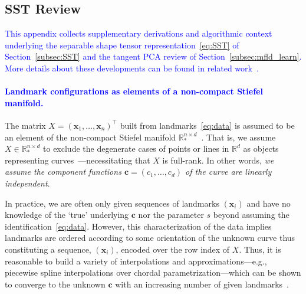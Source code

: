 \documentclass[pdflatex,iicol]{sn-jnl}%
\theoremstyle{thmstyleone}%
\theoremstyle{thmstyletwo}%
\theoremstyle{thmstylethree}%
\begin{document}
\begin{appendices}

\section{SST Review}\label{secA0}
\textcolor{blue}{This appendix collects supplementary derivations and algorithmic context underlying the separable shape tensor representation~\eqref{eq:SST} of Section~\ref{subsec:SST} and the tangent PCA review of Section~\ref{subsec:mfld_learn}. More details about these developments can be found in related work~\cite{grey2023separable}.}

\textcolor{blue}{\paragraph{Landmark configurations as elements of a non-compact Stiefel manifold.}}
The matrix $X = (\boldsymbol{x}_1,\dots,\boldsymbol{x}_n)^{\top}$ built from landmarks~\eqref{eq:data} is assumed to be an element of the non-compact Stiefel manifold $\mathbb{R}^{n \times d}_*$~\cite{absil2008optimization}. That is, we assume $X \in \mathbb{R}^{n \times d}_*$ to exclude the degenerate cases of points or lines in $\mathbb{R}^d$ as objects representing curves~\cite{grey2023separable}---necessitating that $X$ is full-rank. In other words, \textit{we assume the component functions $\boldsymbol{c} = (c_1,\dots,c_d)$ of the curve are linearly independent}.

In practice, we are often only given sequences of landmarks $(\boldsymbol{x}_i)$ and have no knowledge of the `true' underlying $\boldsymbol{c}$ nor the parameter $s$ beyond assuming the identification~\eqref{eq:data}. However, this characterization of the data implies landmarks are ordered according to some orientation of the unknown curve thus constituting a sequence, $(\boldsymbol{x}_i)$, encoded over the row index of $X$. Thus, it is reasonable to build a variety of interpolations and approximations---e.g., piecewise spline interpolations over chordal parametrization---which can be shown to converge to the unknown $\boldsymbol{c}$ with an increasing number of given landmarks~\cite{grey2023separable, floater2005arc}.


\end{appendices}
\end{document}
